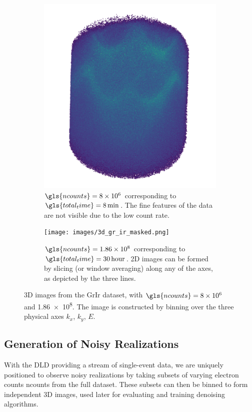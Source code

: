 \begin{figure}[h]
    \centering
    \begin{subfigure}[t]{0.49\linewidth}
        \centering
        \includegraphics[width=1\linewidth]{images/3d_gr_ir_8M.png}
        \caption{$\gls{ncounts}=\num{8e6}$ corresponding to $\gls{total_time}=\qty{8}{min}$. The fine features of the data are not visible due to the low count rate.}
        \label{fig:3d-gr-ir-8M}
    \end{subfigure}
    \hfill
    \begin{subfigure}[t]{0.49\linewidth}
        \centering
        \texttt{[image: images/3d\_gr\_ir\_masked.png]}
        \caption{$\gls{ncounts}=\num{1.86e8}$ corresponding to $\gls{total_time}=\qty{30}{hour}$. 2D images can be formed by slicing (or window averaging) along any of the axes, as depicted by the three lines.}
        \label{fig:3d-gr-ir-186M}
    \end{subfigure}
    \caption{3D images from the \gls{GrIr} dataset, with $\gls{ncounts}=\num{8e6}$ and \num{1.86e8}. The image is constructed by binning over the three physical axes $k_x$, $k_y$, $E$.}
    \label{fig:3d-gr-ir}
\end{figure}

\subsection{Generation of Noisy Realizations}
With the \gls{DLD} providing a stream of single-event data, we are uniquely positioned to observe noisy realizations by taking subsets of varying electron counts \gls{ncounts} from the full dataset. These subsets can then be binned to form independent 3D images, used later for evaluating and training denoising algorithms.


